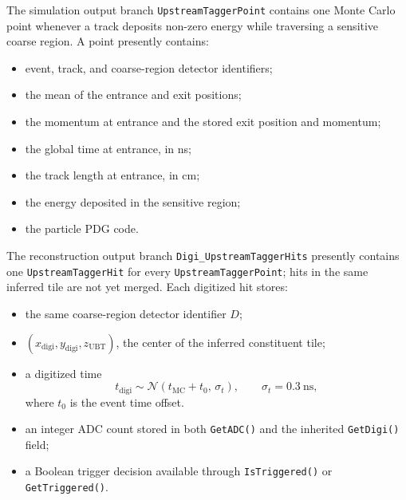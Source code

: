 \begin{technicaldetails}
The simulation output branch \texttt{UpstreamTaggerPoint} contains one Monte
Carlo point whenever a track deposits non-zero energy while traversing
a sensitive coarse region.  A point presently contains:
\begin{itemize}
\item event, track, and coarse-region detector identifiers;
\item the mean of the entrance and exit positions;
\item the momentum at entrance and the stored exit position and momentum;
\item the global time at entrance, in ns;
\item the track length at entrance, in cm;
\item the energy deposited in the sensitive region;
\item the particle PDG code.
\end{itemize}

The reconstruction output branch \texttt{Digi\_UpstreamTaggerHits} presently
contains one \texttt{UpstreamTaggerHit} for every
\texttt{UpstreamTaggerPoint}; hits in the same inferred tile are not yet merged.
Each digitized hit stores:
\begin{itemize}
\item the same coarse-region detector identifier $D$;
\item $(x_\mathrm{digi},y_\mathrm{digi},z_\mathrm{UBT})$, the center of the
      inferred constituent tile;
\item a digitized time
      \[
        t_\mathrm{digi}\sim
        \mathcal{N}(t_\mathrm{MC}+t_0,\,\sigma_t),
        \qquad \sigma_t=0.3~\mathrm{ns},
      \]
      where $t_0$ is the event time offset.
\item an integer ADC count stored in both \texttt{GetADC()} and the inherited
      \texttt{GetDigi()} field;
\item a Boolean trigger decision available through \texttt{IsTriggered()} or
      \texttt{GetTriggered()}.
\end{itemize}
\end{technicaldetails}

